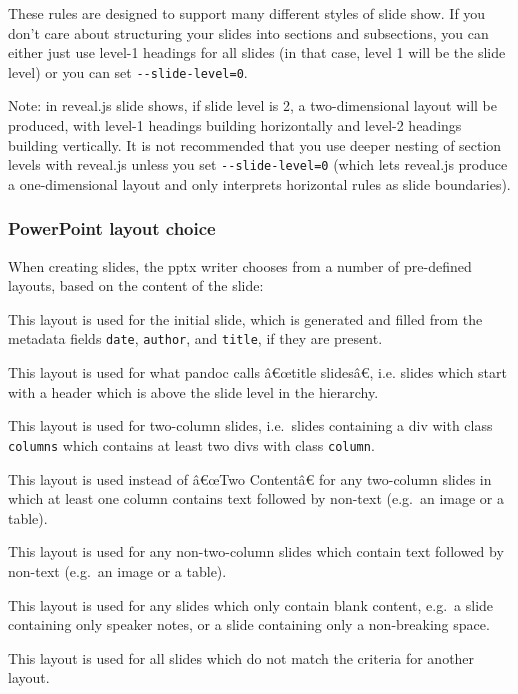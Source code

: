 \documentclass[
]{article}
\providecommand{\tightlist}{%
  \setlength{\itemsep}{0pt}\setlength{\parskip}{0pt}}
\begin{document}
These rules are designed to support many different styles of slide show.
If you don't care about structuring your slides into sections and
subsections, you can either just use level-1 headings for all slides (in
that case, level 1 will be the slide level) or you can set
\texttt{-\/-slide-level=0}.

Note: in reveal.js slide shows, if slide level is 2, a two-dimensional
layout will be produced, with level-1 headings building horizontally and
level-2 headings building vertically. It is not recommended that you use
deeper nesting of section levels with reveal.js unless you set
\texttt{-\/-slide-level=0} (which lets reveal.js produce a
one-dimensional layout and only interprets horizontal rules as slide
boundaries).

\hypertarget{powerpoint-layout-choice}{%
\subsubsection{PowerPoint layout
choice}\label{powerpoint-layout-choice}}

When creating slides, the pptx writer chooses from a number of
pre-defined layouts, based on the content of the slide:

\begin{description}
\tightlist
\item[Title Slide]
This layout is used for the initial slide, which is generated and filled
from the metadata fields \texttt{date}, \texttt{author}, and
\texttt{title}, if they are present.
\item[Section Header]
This layout is used for what pandoc calls â€œtitle slidesâ€, i.e. slides
which start with a header which is above the slide level in the
hierarchy.
\item[Two Content]
This layout is used for two-column slides, i.e.~slides containing a div
with class \texttt{columns} which contains at least two divs with class
\texttt{column}.
\item[Comparison]
This layout is used instead of â€œTwo Contentâ€ for any two-column
slides in which at least one column contains text followed by non-text
(e.g.~an image or a table).
\item[Content with Caption]
This layout is used for any non-two-column slides which contain text
followed by non-text (e.g.~an image or a table).
\item[Blank]
This layout is used for any slides which only contain blank content,
e.g.~a slide containing only speaker notes, or a slide containing only a
non-breaking space.
\item[Title and Content]
This layout is used for all slides which do not match the criteria for
another layout.
\end{description}
\end{document}
